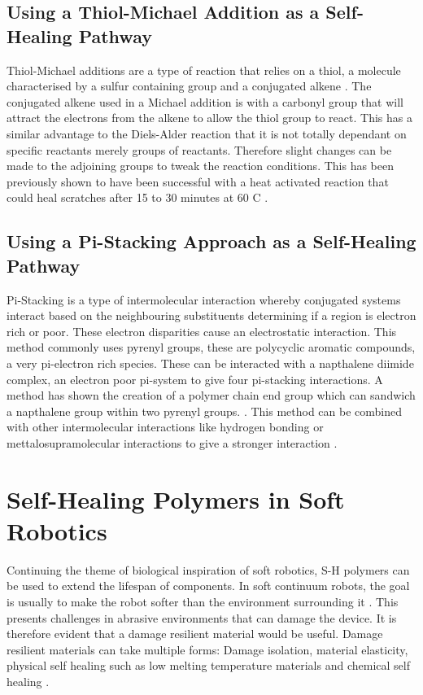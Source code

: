 \subsection{Using a Thiol-Michael Addition as a Self-Healing Pathway}
Thiol-Michael additions are a type of reaction that relies on a thiol, a molecule characterised by a sulfur containing group and a conjugated alkene \cite{nair2014thiol}. The conjugated alkene used in a Michael addition is with a carbonyl group that will attract the electrons from the alkene to allow the thiol group to react. This has a similar advantage to the Diels-Alder reaction that it is not totally dependant on specific reactants merely groups of reactants. Therefore slight changes can be made to the adjoining groups to tweak the reaction conditions. This has been previously shown to have been successful with a heat activated reaction that could heal scratches after 15 to 30 minutes at 60 \degree C \cite{kuhl2016self}. 

\subsection{Using a Pi-Stacking Approach as a Self-Healing Pathway}
Pi-Stacking is a type of intermolecular interaction whereby conjugated systems interact based on the neighbouring substituents determining if a region is electron rich or poor. These electron disparities cause an electrostatic interaction. This method commonly uses pyrenyl groups, these are polycyclic aromatic compounds, a very pi-electron rich species. These can be interacted with a napthalene diimide complex, an electron poor pi-system to give four pi-stacking interactions. A method has shown the creation of a polymer chain end group which can sandwich a napthalene group within two pyrenyl groups. \cite{burattini2011supramolecular}. This method can be combined with other intermolecular interactions like hydrogen bonding \cite{yuan2025self} or mettalosupramolecular interactions to give a stronger interaction \cite{mei2016highly}.


\section{Self-Healing Polymers in Soft Robotics}

Continuing the theme of biological inspiration of soft robotics, S-H polymers can be used to extend the lifespan of components. In soft continuum robots, the goal is usually to make the robot softer than the environment surrounding it \cite{rus2015design}. This presents challenges in abrasive environments that can damage the device. It is therefore evident that a damage resilient material would be useful. Damage resilient materials can take multiple forms: Damage isolation, material elasticity, physical self healing such as low melting temperature materials and chemical self healing \cite{bilodeau2017self}.



